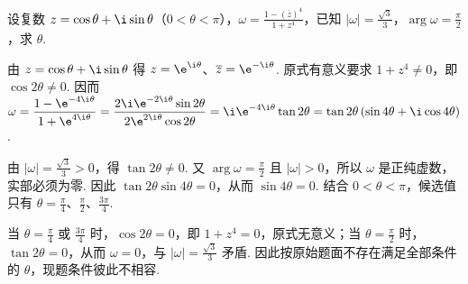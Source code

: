 \documentclass[UTF8,a4paper,oneside,11pt]{ctexbook}
\begin{document}
\begin{problem}
设复数 \(z = \cos \theta + \i\sin \theta\)（\(0 < \theta < \pi\)），\(\omega = \frac{1 - \left( \overline{z} \right)^4}{1 + z^4}\)，已知 \(|\omega| = \frac{\sqrt{3}}{3}\)，\(\arg \omega = \frac{\pi}{2}\)，求 \(\theta\).
\end{problem}

\begin{solution}
由 \(z=\cos\theta+\i\sin\theta\) 得 \(z=\e^{\i\theta}\)、\(\overline{z}=\e^{-\i\theta}\). 原式有意义要求 \(1+z^4\ne0\)，即 \(\cos2\theta\ne0\). 因而
\(\displaystyle\omega=\frac{1-\e^{-4\i\theta}}{1+\e^{4\i\theta}}=\frac{2\i\e^{-2\i\theta}\sin2\theta}{2\e^{2\i\theta}\cos2\theta}=\i\e^{-4\i\theta}\tan2\theta=\tan2\theta\left(\sin4\theta+\i\cos4\theta\right)\).

由 \(|\omega|=\frac{\sqrt{3}}{3}>0\)，得 \(\tan2\theta\ne0\). 又 \(\arg\omega=\frac{\pi}{2}\) 且 \(|\omega|>0\)，所以 \(\omega\) 是正纯虚数，实部必须为零. 因此
\(\tan2\theta\sin4\theta=0\)，从而 \(\sin4\theta=0\). 结合 \(0<\theta<\pi\)，候选值只有 \(\theta=\frac{\pi}{4}\)、\(\frac{\pi}{2}\)、\(\frac{3\pi}{4}\).

当 \(\theta=\frac{\pi}{4}\) 或 \(\frac{3\pi}{4}\) 时，\(\cos2\theta=0\)，即 \(1+z^4=0\)，原式无意义；当 \(\theta=\frac{\pi}{2}\) 时，\(\tan2\theta=0\)，从而 \(\omega=0\)，与 \(|\omega|=\frac{\sqrt{3}}{3}\) 矛盾. 因此按原始题面不存在满足全部条件的 \(\theta\)，现题条件彼此不相容.
\end{solution}

\end{document}
